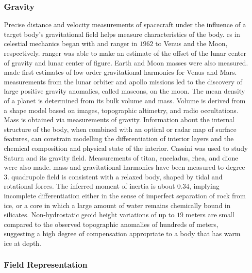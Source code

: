\documentclass[oneside]{book}
\theoremstyle{mystyle}
\begin{document}
\subsubsection{Gravity}
%
\noindent Precise distance and velocity measurements of spacecraft under the influence of a target body's \gls{gravitational field} helps measure characteristics of the body. \gls{rs} in celestial mechanics began with  and \gls{ranger} in $1962$ to Venus and the Moon, respectively. \gls{ranger} was able to make an estimate of the offset of the lunar \gls{center of gravity} and lunar \gls{center of figure}. Earth and Moon masses were also measured.  made first estimates of low order gravitational harmonics for Venus and Mars.  measurements from the \gls{lunar orbiter} and \gls{apollo} missions led to the discovery of large positive gravity anomalies, called \glspl{mascon}, on the moon. The mean density of a planet is determined from its bulk volume and mass. Volume is derived from a shape model based on images, topographic \gls{altimetry}, and radio \glspl{occultation}. Mass is obtained via measurements of gravity. Information about the internal structure of the body, when combined with an optical or radar map of surface features,
can constrain modelling the differentiation of interior layers and the chemical composition and physical state of the interior. Cassini was used to study Saturn and its gravity field. Measurements of \gls{titan}, \gls{enceladus}, \gls{rhea}, and \gls{dione} were also made.  mass and \gls{gravitational harmonics} have been measured to degree $3$.  \gls{quadrupole} field is consistent with a  relaxed body, shaped by tidal and rotational forces. The inferred \gls{moment of inertia} is about $0.34$, implying incomplete differentiation either in the sense of imperfect separation of rock from ice, or a core in which a large amount of water remains chemically bound in silicates. Non-hydrostatic \gls{geoid}
height variations of up to $19$ meters are small compared to the observed topographic anomalies of hundreds of meters, suggesting a high degree of compensation appropriate to a body that has warm ice at depth.

\subsubsection{\footnotesize Field Representation}
\end{document}
